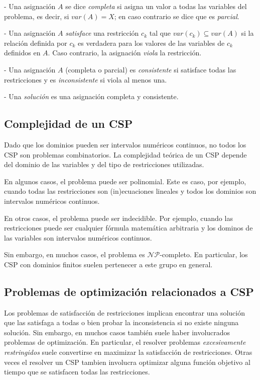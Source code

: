 \documentclass{llncs}
\begin{document}
   - Una asignación $A$ se dice \textit{completa} si asigna un valor a todas las variables del
   problema, es decir, si $var(A) = X$; en caso contrario se dice que es \textit{parcial}.
   
   - Una asignación $A$ \textit{satisface} una restricción $c_k$ tal que $var(c_k) \subseteq var(A)$ si la relación definida por $c_k$ es verdadera para los valores de las variables de $c_k$ definidos en $A$. Caso contrario, la asignación \textit{viola} la restricción.
   
   - Una asignación $A$ (completa o parcial) es \textit{consistente} si satisface todas las restricciones y es \textit{inconsistente} si viola al menos una.
   
   - Una \textit{solución} es una asignación completa y consistente.
   
   \subsection{Complejidad de un CSP}
   \label{subsec:cspComplexity}
   	Dado que los dominios pueden ser intervalos numéricos continuos, no todos los CSP son
   	problemas combinatorios. La complejidad teórica de un CSP depende del dominio de las variables y del tipo de restricciones utilizadas.
   	
   	En algunos casos, el problema puede ser polinomial. Este es caso, por ejemplo, cuando todas
   	las restricciones son (in)ecuaciones lineales y todos los dominios son intervalos numéricos
   	continuos.
   	
   	En otros casos, el problema puede ser indecidible. Por ejemplo, cuando las restricciones puede ser cualquier fórmula matemática arbitraria y los dominos de las variables son intervalos numéricos continuos.
   	
   	Sin embargo, en muchos casos, el problema es $\mathcal{NP}$-completo. En particular, los CSP con dominios finitos suelen pertenecer a este grupo en general.
   	
   	\subsection{Problemas de optimización relacionados a CSP}
   	\label{subsec:cspOptimization}
   	Los problemas de satisfacción de restricciones implican encontrar una solución que las
   	satisfaga a todas o bien probar la inconsistencia si no existe ninguna solución. Sin embargo,
   	en muchos casos también suele haber involucrados problemas de optimización. En particular,
   	el resolver problemas \textit{excesivamente restringidos} suele convertirse en maximizar la
   	satisfacción de restricciones. Otras veces el resolver un CSP tambien involucra optimizar
   	alguna función objetivo al tiempo que se satisfacen todas las restricciones.
   	
\end{document}
